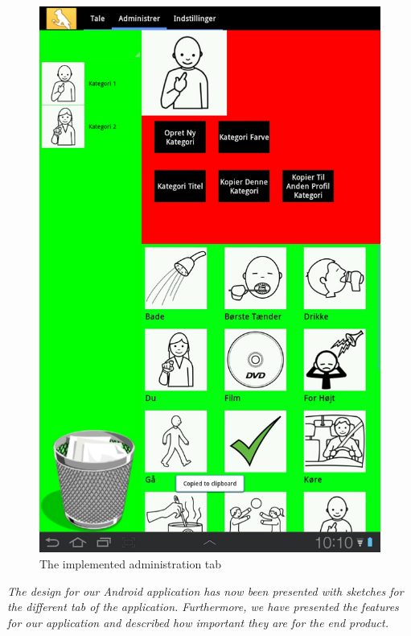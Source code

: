 \begin{figure}
	\centering
		\includegraphics[scale=0.50]{input/images/admincateg.jpg}
	\caption{The implemented administration tab}
	\label{fig:admin_cate}
\end{figure}


\textit{The design for our Android application has now been presented with sketches for the different tab of the application. Furthermore, we have presented the features for our application and described how important they are for the end product.} 